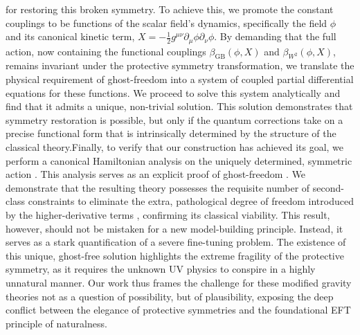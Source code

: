\documentclass[twocolumn]{aastex631}
\begin{document}
for restoring this broken symmetry. To achieve this, we promote the constant couplings to be functions of the scalar field's dynamics, specifically the field $\phi$ and its canonical kinetic term, $X = -\frac{1}{2}g^{\mu\nu}\partial_\mu\phi\partial_\nu\phi$. By demanding that the full action, now containing the functional couplings $\beta_{\text{GB}}(\phi, X)$ and $\beta_{W^2}(\phi, X)$, remains invariant under the protective symmetry transformation, we translate the physical requirement of ghost-freedom into a system of coupled partial differential equations for these functions. We proceed to solve this system analytically and find that it admits a unique, non-trivial solution. This solution demonstrates that symmetry restoration is possible, but only if the quantum corrections take on a precise functional form that is intrinsically determined by the structure of the classical theory.Finally, to verify that our construction has achieved its goal, we perform a canonical Hamiltonian analysis on the uniquely determined, symmetric action \citep{molaee2021hamiltonianformalismghostfree,escalante2024hamiltoniananalysisperturbativelambda}. This analysis serves as an explicit proof of ghost-freedom \citep{molaee2021hamiltonianformalismghostfree,gomes2024pathologicalcharactermodificationscoincident}. We demonstrate that the resulting theory possesses the requisite number of second-class constraints to eliminate the extra, pathological degree of freedom introduced by the higher-derivative terms \citep{molaee2021hamiltonianformalismghostfree,escalante2024hamiltoniananalysisperturbativelambda}, confirming its classical viability. This result, however, should not be mistaken for a new model-building principle. Instead, it serves as a stark quantification of a severe fine-tuning problem. The existence of this unique, ghost-free solution highlights the extreme fragility of the protective symmetry, as it requires the unknown UV physics to conspire in a highly unnatural manner. Our work thus frames the challenge for these modified gravity theories not as a question of possibility, but of plausibility, exposing the deep conflict between the elegance of protective symmetries and the foundational EFT principle of naturalness.
\end{document}

